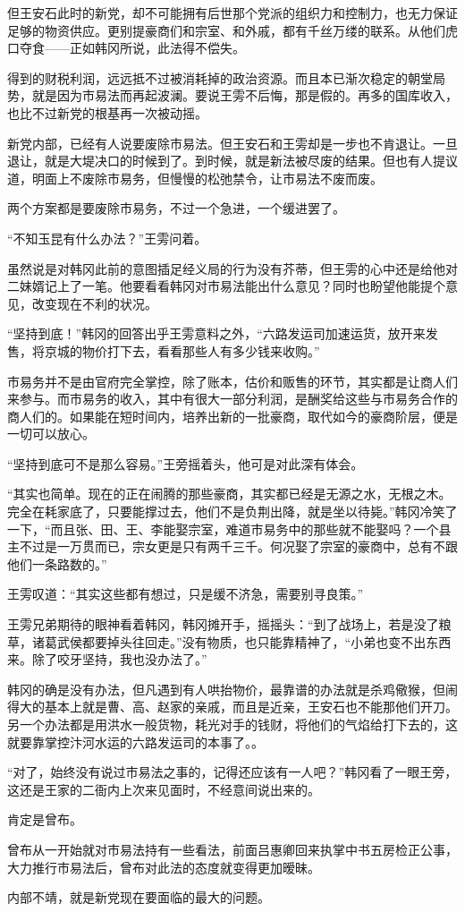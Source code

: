 但王安石此时的新党，却不可能拥有后世那个党派的组织力和控制力，也无力保证足够的物资供应。更别提豪商们和宗室、和外戚，都有千丝万缕的联系。从他们虎口夺食——正如韩冈所说，此法得不偿失。

得到的财税利润，远远抵不过被消耗掉的政治资源。而且本已渐次稳定的朝堂局势，就是因为市易法而再起波澜。要说王雱不后悔，那是假的。再多的国库收入，也比不过新党的根基再一次被动摇。

新党内部，已经有人说要废除市易法。但王安石和王雱却是一步也不肯退让。一旦退让，就是大堤决口的时候到了。到时候，就是新法被尽废的结果。但也有人提议道，明面上不废除市易务，但慢慢的松弛禁令，让市易法不废而废。

两个方案都是要废除市易务，不过一个急进，一个缓进罢了。

“不知玉昆有什么办法？”王雱问着。

虽然说是对韩冈此前的意图插足经义局的行为没有芥蒂，但王雱的心中还是给他对二妹婿记上了一笔。他要看看韩冈对市易法能出什么意见？同时也盼望他能提个意见，改变现在不利的状况。

“坚持到底！”韩冈的回答出乎王雱意料之外，“六路发运司加速运货，放开来发售，将京城的物价打下去，看看那些人有多少钱来收购。”

市易务并不是由官府完全掌控，除了账本，估价和贩售的环节，其实都是让商人们来参与。而市易务的收入，其中有很大一部分利润，是酬奖给这些与市易务合作的商人们的。如果能在短时间内，培养出新的一批豪商，取代如今的豪商阶层，便是一切可以放心。

“坚持到底可不是那么容易。”王旁摇着头，他可是对此深有体会。

“其实也简单。现在的正在闹腾的那些豪商，其实都已经是无源之水，无根之木。完全在耗家底了，只要能撑过去，他们不是负荆出降，就是坐以待毙。”韩冈冷笑了一下，“而且张、田、王、李能娶宗室，难道市易务中的那些就不能娶吗？一个县主不过是一万贯而已，宗女更是只有两千三千。何况娶了宗室的豪商中，总有不跟他们一条路数的。”

王雱叹道：“其实这些都有想过，只是缓不济急，需要别寻良策。”

王雱兄弟期待的眼神看着韩冈，韩冈摊开手，摇摇头：“到了战场上，若是没了粮草，诸葛武侯都要掉头往回走。”没有物质，也只能靠精神了，“小弟也变不出东西来。除了咬牙坚持，我也没办法了。”

韩冈的确是没有办法，但凡遇到有人哄抬物价，最靠谱的办法就是杀鸡儆猴，但闹得大的基本上就是曹、高、赵家的亲戚，而且是近亲，王安石也不能那他们开刀。另一个办法都是用洪水一般货物，耗光对手的钱财，将他们的气焰给打下去的，这就要靠掌控汴河水运的六路发运司的本事了。。

“对了，始终没有说过市易法之事的，记得还应该有一人吧？”韩冈看了一眼王旁，这还是王家的二衙内上次来见面时，不经意间说出来的。

肯定是曾布。

曾布从一开始就对市易法持有一些看法，前面吕惠卿回来执掌中书五房检正公事，大力推行市易法后，曾布对此法的态度就变得更加暧昧。

内部不靖，就是新党现在要面临的最大的问题。

